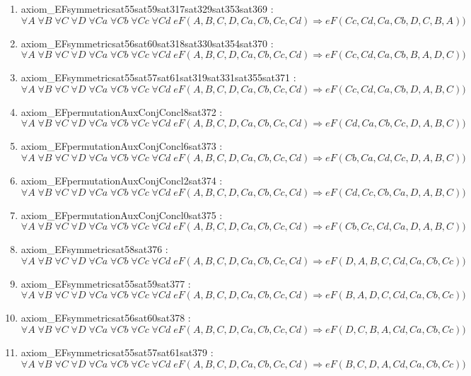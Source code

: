 \documentclass{article}
\begin{document}
\begin{enumerate}
\item axiom\_EFsymmetricsat55sat59sat317sat329sat353sat369 : $\forall A\;\forall B\;\forall C\;\forall D\;\forall Ca\;\forall Cb\;\forall Cc\;\forall Cd\;eF(A, B, C, D, Ca, Cb, Cc, Cd) \Rightarrow eF(Cc, Cd, Ca, Cb, D, C, B, A))$
\item axiom\_EFsymmetricsat56sat60sat318sat330sat354sat370 : $\forall A\;\forall B\;\forall C\;\forall D\;\forall Ca\;\forall Cb\;\forall Cc\;\forall Cd\;eF(A, B, C, D, Ca, Cb, Cc, Cd) \Rightarrow eF(Cc, Cd, Ca, Cb, B, A, D, C))$
\item axiom\_EFsymmetricsat55sat57sat61sat319sat331sat355sat371 : $\forall A\;\forall B\;\forall C\;\forall D\;\forall Ca\;\forall Cb\;\forall Cc\;\forall Cd\;eF(A, B, C, D, Ca, Cb, Cc, Cd) \Rightarrow eF(Cc, Cd, Ca, Cb, D, A, B, C))$
\item axiom\_EFpermutationAuxConjConcl8sat372 : $\forall A\;\forall B\;\forall C\;\forall D\;\forall Ca\;\forall Cb\;\forall Cc\;\forall Cd\;eF(A, B, C, D, Ca, Cb, Cc, Cd) \Rightarrow eF(Cd, Ca, Cb, Cc, D, A, B, C))$
\item axiom\_EFpermutationAuxConjConcl6sat373 : $\forall A\;\forall B\;\forall C\;\forall D\;\forall Ca\;\forall Cb\;\forall Cc\;\forall Cd\;eF(A, B, C, D, Ca, Cb, Cc, Cd) \Rightarrow eF(Cb, Ca, Cd, Cc, D, A, B, C))$
\item axiom\_EFpermutationAuxConjConcl2sat374 : $\forall A\;\forall B\;\forall C\;\forall D\;\forall Ca\;\forall Cb\;\forall Cc\;\forall Cd\;eF(A, B, C, D, Ca, Cb, Cc, Cd) \Rightarrow eF(Cd, Cc, Cb, Ca, D, A, B, C))$
\item axiom\_EFpermutationAuxConjConcl0sat375 : $\forall A\;\forall B\;\forall C\;\forall D\;\forall Ca\;\forall Cb\;\forall Cc\;\forall Cd\;eF(A, B, C, D, Ca, Cb, Cc, Cd) \Rightarrow eF(Cb, Cc, Cd, Ca, D, A, B, C))$
\item axiom\_EFsymmetricsat58sat376 : $\forall A\;\forall B\;\forall C\;\forall D\;\forall Ca\;\forall Cb\;\forall Cc\;\forall Cd\;eF(A, B, C, D, Ca, Cb, Cc, Cd) \Rightarrow eF(D, A, B, C, Cd, Ca, Cb, Cc))$
\item axiom\_EFsymmetricsat55sat59sat377 : $\forall A\;\forall B\;\forall C\;\forall D\;\forall Ca\;\forall Cb\;\forall Cc\;\forall Cd\;eF(A, B, C, D, Ca, Cb, Cc, Cd) \Rightarrow eF(B, A, D, C, Cd, Ca, Cb, Cc))$
\item axiom\_EFsymmetricsat56sat60sat378 : $\forall A\;\forall B\;\forall C\;\forall D\;\forall Ca\;\forall Cb\;\forall Cc\;\forall Cd\;eF(A, B, C, D, Ca, Cb, Cc, Cd) \Rightarrow eF(D, C, B, A, Cd, Ca, Cb, Cc))$
\item axiom\_EFsymmetricsat55sat57sat61sat379 : $\forall A\;\forall B\;\forall C\;\forall D\;\forall Ca\;\forall Cb\;\forall Cc\;\forall Cd\;eF(A, B, C, D, Ca, Cb, Cc, Cd) \Rightarrow eF(B, C, D, A, Cd, Ca, Cb, Cc))$

\end{enumerate}
\end{document}
